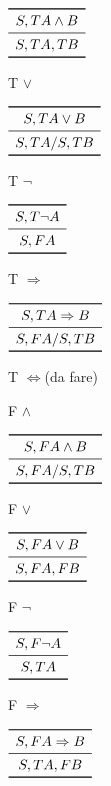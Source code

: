 $\begin{array}{c}
\toprule
S,T A \land B \\
\midrule
S, TA, TB \\
\bottomrule
\end{array}$

T $\lor$

$\begin{array}{c}
\toprule
S,T A \lor B \\
\midrule
S, TA/ S, TB \\
\bottomrule
\end{array}$

T $\neg$

$\begin{array}{c}
\toprule
S,T \neg A \\
\midrule
S, FA \\
\bottomrule
\end{array}$

T $\Rightarrow$

$\begin{array}{c}
\toprule
S,T A \Rightarrow B \\
\midrule
S, FA / S, TB \\
\bottomrule
\end{array}$

T $\iff$(da fare)

F $\land$

$\begin{array}{c}
\toprule
S,F A \land B \\
\midrule
S, FA/ S, TB \\
\bottomrule
\end{array}$

F $\lor$

$\begin{array}{c}
\toprule
S,F A \lor B \\
\midrule
S, FA, FB \\
\bottomrule
\end{array}$

F $\neg$

$\begin{array}{c}
\toprule
S,F \neg A \\
\midrule
S, TA \\
\bottomrule
\end{array}$

F $\Rightarrow$

$\begin{array}{c}
\toprule
S,F A \Rightarrow B \\
\midrule
S, TA, FB \\
\bottomrule
\end{array}$

